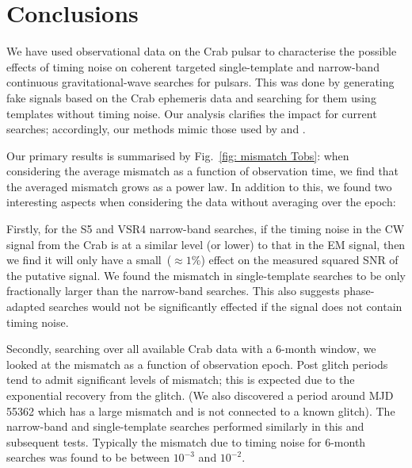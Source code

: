 \documentclass[../full_thesis/full_thesis.tex]{subfiles}
\begin{document}

\section{Conclusions}
\label{sec: narrow-band conclusions}
We have used observational data on the Crab pulsar to characterise the possible
effects of timing noise on coherent targeted single-template  and narrow-band
continuous gravitational-wave searches for pulsars.  This was done by generating fake
signals based on the Crab ephemeris data and searching for them using templates
without timing noise. Our analysis clarifies the impact for current searches;
accordingly, our methods mimic those used by \citet{ligo2008} and \citet{LIGO2015}.

Our primary results is summarised by Fig.~\ref{fig: mismatch Tobs}:
when considering the average mismatch as
a function of observation time,  we find that the averaged
mismatch grows as a power law. In addition to this, we found two interesting
aspects when considering the data without averaging over the epoch:

Firstly, for the S5 and VSR4 narrow-band searches, if the timing noise in the
CW signal from the Crab is at a similar level (or lower) to that in the EM
signal, then we find it will only have a small~($\approx1\%$) effect on the
measured squared SNR of the putative signal.  We found the mismatch in
single-template searches to be only fractionally larger than the narrow-band
searches.  This also suggests phase-adapted searches would not be significantly
effected if the signal does not contain timing noise.

Secondly, searching over all available Crab data with a 6-month window, we
looked at the mismatch as a function of observation epoch. Post glitch periods
tend to admit significant levels of mismatch; this is expected due to the
exponential recovery from the glitch. (We also discovered a period around MJD
55362 which has a large mismatch and is not connected to a known glitch). The
narrow-band and single-template searches performed similarly in this and
subsequent tests. Typically the mismatch due to timing noise for 6-month
searches was found to be between $10^{-3}$ and $10^{-2}$.
\end{document}
